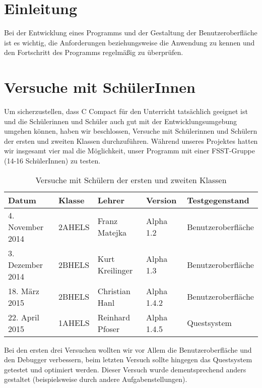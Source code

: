 

\section{Einleitung}

Bei der Entwicklung eines Programms und der Gestaltung der Benutzeroberfläche ist es wichtig, die Anforderungen beziehungsweise die Anwendung zu kennen und den Fortschritt des Programms regelmäßig zu überprüfen.

\section{Versuche mit SchülerInnen}
Um sicherzustellen, dass C Compact für den Unterricht tatsächlich geeignet ist und die Schülerinnen und Schüler auch gut mit der Entwicklungsumgebung umgehen können, haben wir beschlossen, Versuche mit Schülerinnen und Schülern der ersten und zweiten Klassen durchzuführen. Während unseres Projektes hatten wir insgesamt vier mal die Möglichkeit, unser Programm mit einer FSST-Gruppe (14-16 SchülerInnen) zu testen.

\begin{table}[h!]
\begin{tabular}{|l|l|l||l|l|}
\hline
Datum & Klasse & Lehrer & Version & Testgegenstand \\
\hline
4. November 2014 & 2AHELS & Franz Matejka & Alpha 1.2 & Benutzeroberfläche \\
3. Dezember 2014 & 2BHELS & Kurt Kreilinger & Alpha 1.3 & Benutzeroberfläche \\
18. März 2015 & 2BHELS & Christian Hanl & Alpha 1.4.2 & Benutzeroberfläche \\
22. April 2015 & 1AHELS & Reinhard Pfoser & Alpha 1.4.5 & Questsystem \\
\hline
\end{tabular}
\caption{Versuche mit Schülern der ersten und zweiten Klassen}
\end{table}

Bei den ersten drei Versuchen wollten wir vor Allem die Benutzeroberfläche und den Debugger verbessern, beim letzten Versuch sollte hingegen das Questsystem getestet und optimiert werden. Dieser Versuch wurde dementsprechend anders gestaltet (beispielsweise durch andere Aufgabenstellungen).

